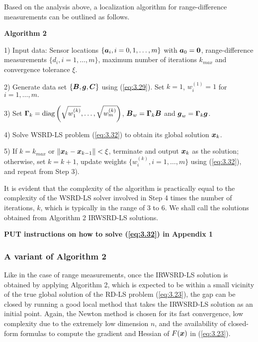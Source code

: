 Based on the analysis above, a localization algorithm for range-difference measurements can be outlined as follows.

\textbf{Algorithm 2} \label{alg:rd-ls}

1) Input data: Sensor locations $\{\mbox{\boldmath$a$}_i, i=0, 1,\ldots,m\}$ with $\mbox{\boldmath$a$}_0=\mbox{\boldmath{$0$}}$, range-difference measurements $\{d_i, i = 1,\ldots,m\}$, maximum number of iterations $k_{max}$ and convergence tolerance $\xi$.

2) Generate data set $\{\mbox{\boldmath$B$}, \mbox{\boldmath$g$}, \mbox{\boldmath$C$}\}$ using (\ref{eq:3.29}). Set $k=1$, $w_i^{(1)}=1$ for $i=1,\ldots,m.$

3) Set $\mbox{\boldmath{$\Gamma$}}_k=\mbox{diag}\left(\sqrt{w_1^{(k)}},\ldots,\sqrt{w_m^{(k)}}\right)$, $\mbox{\boldmath$B$}_w=\mbox{\boldmath{$\Gamma$}}_k\mbox{\boldmath$B$}$ and $\mbox{\boldmath$g$}_w=\mbox{\boldmath{$\Gamma$}}_k\mbox{\boldmath$g$}$.

4) Solve WSRD-LS problem (\ref{eq:3.32}) to obtain its global solution $\mbox{\boldmath$x$}_k$.

5) If $k=k_{max}$ or $\|\mbox{\boldmath$x$}_k-\mbox{\boldmath$x$}_{k-1}\|<\xi$, terminate and output $\mbox{\boldmath$x$}_k$ as the solution; otherwise, set $k=k+1$, update weights $\{w_i^{(k)}, i=1,\ldots,m\}$ using (\ref{eq:3.32}), and repeat from Step 3).

It is evident that the complexity of the algorithm is practically equal to the complexity of the WSRD-LS solver involved in Step 4 times the number of iterations, $k$, which is typically in the range of 3 to 6. We shall call the solutions obtained from Algorithm 2 IRWSRD-LS solutions.

\textbf{PUT instructions on how to solve (\ref{eq:3.32}) in Appendix 1}

\subsubsection{A variant of Algorithm 2}

Like in the case of range measurements, once the IRWSRD-LS solution is obtained by applying Algorithm 2, which is expected to be within a small vicinity of the true global solution of the RD-LS problem (\ref{eq:3.23}), the gap can be closed by running a good local method that takes the IRWSRD-LS solution as an initial point. Again, the Newton method is chosen for its fast convergence, low complexity due to the extremely low dimension $n$, and the availability of closed-form formulas to compute the gradient and Hessian of $F(\mbox{\boldmath$x$})$ in (\ref{eq:3.23}).

